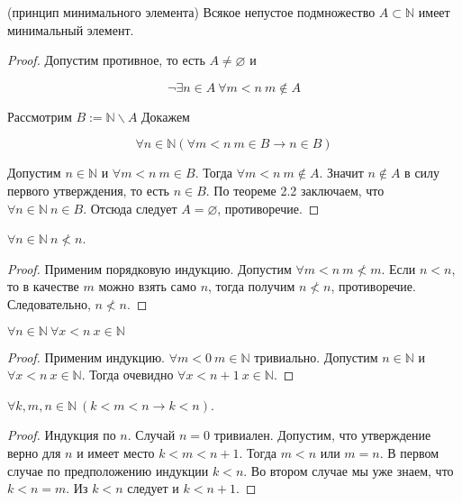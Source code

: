 \begin{theorem}
	(принцип минимального элемента) Всякое непустое подмножество $A \subset \mathbb{N}$ имеет минимальный элемент.
\end{theorem}

\begin{proof} Допустим противное, то есть $A \neq \varnothing$ и

	$$\neg \exists n \in A \ \forall m<n \  m \notin A$$

	Рассмотрим $B:=\mathbb{N} \backslash A$ Докажем

	$$\forall n \in \mathbb{N}(\forall m<n \  m \in B \rightarrow n \in B)$$

	Допустим $n \in \mathbb{N}$ и $\forall m<n \  m \in B$. Тогда $\forall m<n \ m \notin A$. Значит $n \notin A$ в
	силу первого утверждения, то есть $n \in B$. По теореме 2.2 заключаем, что $\forall n \in \mathbb{N} \ n \in
	B$. Отсюда следует $A = \varnothing$, противоречие.
\end{proof}

\begin{corollary}
	$\forall n \in \mathbb{N} \ n \not<n$.
\end{corollary}

\begin{proof} 
	Применим порядковую индукцию. Допустим $\forall m < n \ m \not< m$. Если $ n < n$, то в качестве $m$ можно
	взять само $n$, тогда получим
	$n \not< n$, противоречие. Следовательно, $n \not< n$. 
\end{proof}

\begin{corollary} 
	$\forall n \in \mathbb{N} \ \forall x<n \ x \in \mathbb{N}$ 
\end{corollary}

\begin{proof} 
	Применим индукцию. $\forall m < 0 \ m \in \mathbb{N}$ тривиально.
	Допустим $n \in \mathbb{N}$ и $\forall x<n \ x \in \mathbb{N}$. Тогда очевидно $\forall x<n+1 \ x \in \mathbb{N}$. 
\end{proof}

\begin{corollary} 
	$\forall k, m, n \in \mathbb{N} \ (k<m<n \rightarrow k<n)$.
\end{corollary}

\begin{proof} 
	Индукция по $n$. Случай $n = 0$ тривиален. Допустим, что утверждение верно для $n$ и имеет место $k<m<n + 1$.
	Тогда $m < n$ или $m = n$. В первом случае по предположению индукции $k < n$. Во втором случае мы уже знаем,
	что $k < n = m$. Из $k < n$ следует и
	$k < n + 1$. 
\end{proof}

